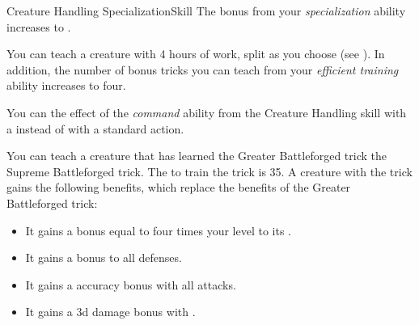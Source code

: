 \begin{feat}{Creature Handling Specialization}{Skill}
         The bonus from your \textit{specialization} ability increases to .

         You can teach a creature with 4 hours of work, split as you choose (see ).
        In addition, the number of bonus tricks you can teach from your \textit{efficient training} ability increases to four.

         You can  the effect of the \textit{command} ability from the Creature Handling skill with a  instead of with a standard action.

          You can teach a creature that has learned the Greater Battleforged trick the Supreme Battleforged trick.
        The  to train the trick is 35.
        A creature with the trick gains the following benefits, which replace the benefits of the Greater Battleforged trick:
        \begin{itemize}
            \item It gains a bonus equal to four times your level to its .
            \item It gains a  bonus to all defenses.
            \item It gains a  accuracy bonus with all attacks.
            \item It gains a \plus3d damage bonus with .
        \end{itemize}
    \end{feat}

